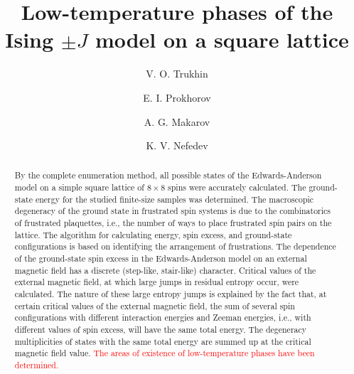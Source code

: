 \documentclass[preprint,12pt]{elsarticle}
\begin{document}
	
	\begin{frontmatter}
		
		
		\title{Low-temperature phases of the Ising $\pm J$ model on a square lattice}
		
		\author[FEFU,IPM]{V. O. Trukhin}
		\author[FEFU]{E. I. Prokhorov}
		\author[FEFU,IPM]{A. G. Makarov}
		\author[FEFU,IPM]{K. V. Nefedev}
		
		\begin{abstract}
			
			By the complete enumeration method, all possible states of the Edwards-Anderson model on a simple square lattice of $8 \times 8$ spins were accurately calculated. The ground-state energy for the studied finite-size samples was determined. The macroscopic degeneracy of the ground state in frustrated spin systems is due to the combinatorics of frustrated plaquettes, i.e., the number of ways to place frustrated spin pairs on the lattice. The algorithm for calculating energy, spin excess, and ground-state configurations is based on identifying the arrangement of frustrations. The dependence of the ground-state spin excess in the Edwards-Anderson model on an external magnetic field has a discrete (step-like, stair-like) character. Critical values of the external magnetic field, at which large jumps in residual entropy occur, were calculated. The nature of these large entropy jumps is explained by the fact that, at certain critical values of the external magnetic field, the sum of several spin configurations with different interaction energies and Zeeman energies, i.e., with different values of spin excess, will have the same total energy. The degeneracy multiplicities of states with the same total energy are summed up at the critical magnetic field value. \textcolor{red}{The areas of existence of low-temperature phases have been determined.}
			

\end{abstract}
\end{frontmatter}
\end{document}
